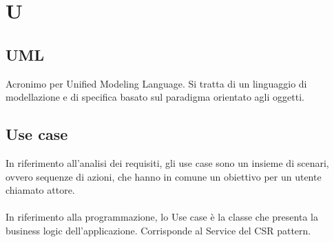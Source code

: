 \chapter{U}
\section{UML}\label{sec:Unified Modeling Language}
Acronimo per Unified Modeling Language. Si tratta di un linguaggio di modellazione e di specifica basato sul paradigma orientato agli oggetti.

\section{Use case}\label{sec:Use Case}
In riferimento all'analisi dei requisiti, gli use case sono un insieme di scenari, ovvero sequenze di azioni, che hanno in comune un obiettivo per un utente chiamato attore.\\ \\
In riferimento alla programmazione, lo Use case è la classe che presenta la business logic dell'applicazione. Corrisponde al Service del CSR pattern.
